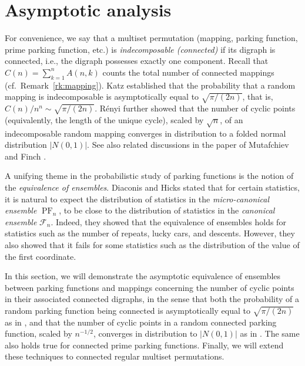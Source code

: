 \documentclass[letterpaper]{amsart}
\theoremstyle{plain}
\theoremstyle{definition}
\theoremstyle{remark}
\DeclareMathOperator{\PF}{PF}
\begin{document}
\section{Asymptotic analysis}
\label{sec:aa}
For convenience, we say that a multiset permutation (mapping, parking function, prime parking function, etc.) is \emph{indecomposable (connected)} if its digraph is connected, i.e., the digraph possesses exactly one component. Recall that $C(n)=\sum_{k=1}^n A(n,k)$ counts the total number of connected mappings (cf.~Remark~\ref{rk:mapping}). Katz \cite{Katz1955} established that the probability that a random mapping is indecomposable is asymptotically equal to $\sqrt{\pi/(2n)}$, that is, $C(n)/n^n \sim \sqrt{\pi/(2n)}$. R\'{e}nyi \cite{Renyi1959} further showed that the number of cyclic points (equivalently, the length of the unique cycle), scaled by $\sqrt{n}$, of an indecomposable random mapping converges in distribution to a folded normal distribution $|N(0,1)|$. See also related discussions in the paper of Mutafchiev and Finch \cite{Mutafchiev2024}.

A unifying theme in the probabilistic study of parking functions is the notion of the {\em equivalence of ensembles}.
Diaconis and Hicks \cite{Diaconis2017} stated that for certain statistics, it is natural to expect the distribution of statistics in the \emph{micro-canonical ensemble} $\PF_n$, to be close to the distribution of statistics in the \emph{canonical ensemble} $\mathcal{F}_n$. Indeed, they showed that the equivalence of ensembles holds for statistics such as the number of repeats, lucky cars, and descents. However, they also showed that it fails for some statistics such as the distribution of the value of the first coordinate.

In this section, we will demonstrate the asymptotic equivalence of ensembles between parking functions and mappings concerning the number of cyclic points in their associated connected digraphs, in the sense that both the probability of a random parking function being connected is asymptotically equal to $\sqrt{\pi/(2n)}$ as in \cite{Katz1955}, and that the number of cyclic points in a random connected parking function, scaled by $n^{-1/2}$, converges in distribution to $|N(0,1)|$ as in \cite{Renyi1959}. The same also holds true for connected prime parking functions. Finally, we will extend these techniques to connected regular multiset permutations. 
\end{document}
